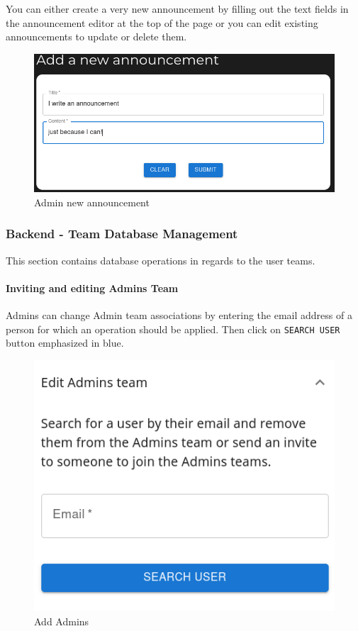 \documentclass[
]{article}
\begin{document}
You can either create a very new announcement by filling out the text
fields in the announcement editor at the top of the page or you can edit
existing announcements to update or delete them.

\begin{figure}
\centering
\includegraphics{images/create_new_announcement.png}
\caption{Admin new announcement}
\end{figure}\newpage

\hypertarget{backend---team-database-management}{%
\subsubsection{Backend - Team Database
Management}\label{backend---team-database-management}}

This section contains database operations in regards to the user teams.

\hypertarget{inviting-and-editing-admins-team}{%
\paragraph{Inviting and editing Admins
Team}\label{inviting-and-editing-admins-team}}

Admins can change Admin team associations by entering the email address
of a person for which an operation should be applied. Then click on
\texttt{SEARCH\ USER} button emphasized in blue.

\begin{figure}
\centering
\includegraphics{images/adding_admins.png}
\caption{Add Admins}
\end{figure}
\end{document}
